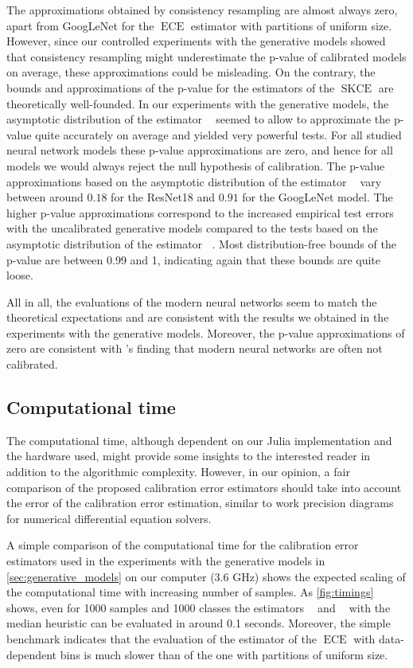 \documentclass{article}
\DeclareMathOperator{\ECE}{ECE}
\DeclareMathOperator{\squaredkernelmeasure}{SKCE}
\DeclareMathOperator{\biasedestimator}{\widehat{SKCE}_b}
\DeclareMathOperator{\unbiasedestimator}{\widehat{SKCE}_{uq}}
\DeclareMathOperator{\linearestimator}{\widehat{SKCE}_{ul}}
\begin{document}
The approximations obtained by consistency resampling are almost always zero,
apart from GoogLeNet for the $\ECE$ estimator with partitions of uniform size.
However, since our controlled experiments with the generative models showed that
consistency resampling might underestimate the p-value of calibrated
models on average, these approximations could be misleading. On the contrary, the
bounds and approximations of the p-value for the estimators of the
$\squaredkernelmeasure$ are theoretically well-founded. In our experiments with
the generative models, the asymptotic distribution of the estimator
$\unbiasedestimator$ seemed to allow to approximate the p-value quite accurately
on average and yielded very powerful tests. For all studied neural network models
these p-value approximations are zero, and hence for all models we would always
reject the null hypothesis of calibration. The p-value approximations based on
the asymptotic distribution of the estimator $\linearestimator$ vary between
around $0.18$ for the ResNet18 and $0.91$ for the GoogLeNet model. The higher
p-value approximations correspond to the increased empirical test errors with the
uncalibrated generative models compared to the tests based on the asymptotic
distribution of the estimator $\unbiasedestimator$. Most distribution-free
bounds of the p-value are between 0.99 and 1, indicating again that these bounds
are quite loose.

All in all, the evaluations of the modern neural networks seem to match the
theoretical expectations and are consistent with the results we obtained in
the experiments with the generative models. Moreover, the p-value
approximations of zero are consistent with \citet{guo17_calib_moder_neural_networ}'s
finding that modern neural networks are often not calibrated.

\subsection{Computational time}\label{sec:computational_time}

The computational time, although dependent on our Julia implementation and
the hardware used, might provide some insights to the interested reader in
addition to the algorithmic complexity. However, in our opinion, a fair
comparison of the proposed calibration error estimators should take into
account the error of the calibration error estimation, similar to work
precision diagrams for numerical differential equation solvers.

A simple comparison of the computational time for the calibration error
estimators used in the experiments with the generative models in
\cref{sec:generative_models} on our computer (3.6 GHz) shows the expected
scaling of the computational time with increasing number of samples. As
\cref{fig:timings} shows, even for 1000 samples and 1000 classes the estimators
$\biasedestimator$ and $\unbiasedestimator$ with the median heuristic can be
evaluated in around 0.1 seconds. Moreover, the simple benchmark indicates that
the evaluation of the estimator of the $\ECE$ with data-dependent bins is much
slower than of the one with partitions of uniform size.
\end{document}
